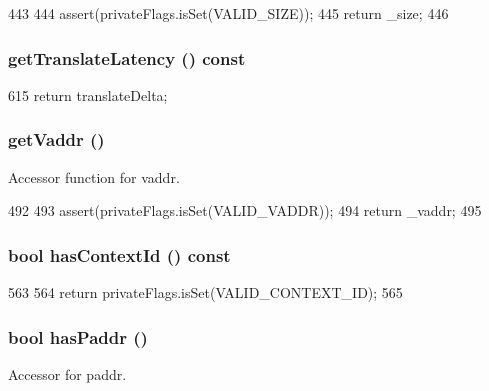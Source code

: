 \begin{DoxyCode}
443     {
444         assert(privateFlags.isSet(VALID_SIZE));
445         return _size;
446     }
\end{DoxyCode}
\hypertarget{classRequest_a03c6d5bbbf5443f44d5e66420ab8eb19}{
\subsubsection[{getTranslateLatency}]{ getTranslateLatency () const}}
\label{classRequest_a03c6d5bbbf5443f44d5e66420ab8eb19}



\begin{DoxyCode}
615 { return translateDelta; }
\end{DoxyCode}
\hypertarget{classRequest_a68d2230b37b30d25462093fefdd813ac}{
\subsubsection[{getVaddr}]{ getVaddr ()}}
\label{classRequest_a68d2230b37b30d25462093fefdd813ac}
Accessor function for vaddr. 


\begin{DoxyCode}
492     {
493         assert(privateFlags.isSet(VALID_VADDR));
494         return _vaddr;
495     }
\end{DoxyCode}
\hypertarget{classRequest_a2b2cd3fd53b1fb8c401187ca87f810f5}{
\subsubsection[{hasContextId}]{\setlength{\rightskip}{0pt plus 5cm}bool hasContextId () const}}
\label{classRequest_a2b2cd3fd53b1fb8c401187ca87f810f5}



\begin{DoxyCode}
563     {
564         return privateFlags.isSet(VALID_CONTEXT_ID);
565     }
\end{DoxyCode}
\hypertarget{classRequest_af9673cab591724dc74122a8e663389ce}{
\subsubsection[{hasPaddr}]{\setlength{\rightskip}{0pt plus 5cm}bool hasPaddr ()}}
\label{classRequest_af9673cab591724dc74122a8e663389ce}
Accessor for paddr. 


